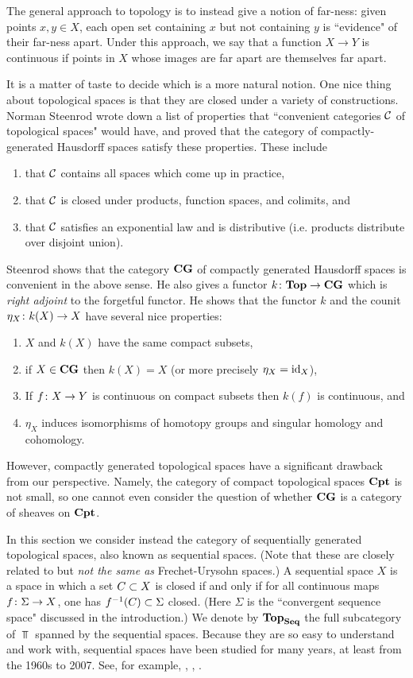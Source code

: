 \documentclass{amsart}
\def\Seq{{\bf Seq}}
\def\CG{{\bf CG}}
\begin{document}
The general approach to topology is to instead give a notion of far-ness: given points $x,y\in X$, each open set containing $x$ but not containing $y$ is ``evidence" of their far-ness apart.  Under this approach, we say that a function $X\to Y$ is continuous if points in $X$ whose images are far apart are themselves far apart.

It is a matter of taste to decide which is a more natural notion.  One nice thing about topological spaces is that they are closed under a variety of constructions.  Norman Steenrod \cite{Ste} wrote down a list of properties that ``convenient categories $\mcC$ of topological spaces" would have, and proved that the category of compactly-generated Hausdorff spaces satisfy these properties.  These include \begin{enumerate}\item that $\mcC$ contains all spaces which come up in practice, \item that $\mcC$ is closed under products, function spaces, and colimits, and \item that $\mcC$ satisfies an exponential law and is distributive (i.e. products distribute over disjoint union). \end{enumerate}

Steenrod shows that the category $\CG$ of compactly generated Hausdorff spaces is convenient in the above sense.  He also gives a functor $k\taking\Top\to\CG$ which is {\em right adjoint} to the forgetful functor.  He shows that the functor $k$ and the counit $\eta_X\taking k(X)\to X$ have several nice properties: \begin{enumerate}\item $X$ and $k(X)$ have the same compact subsets, \item if $X\in\CG$ then $k(X)=X$ (or more precisely $\eta_X=\id_X$), \item If $f\taking X\to Y$ is continuous on compact subsets then $k(f)$ is continuous, and \item $\eta_X$ induces isomorphisms of homotopy groups and singular homology and cohomology.\end{enumerate}

However, compactly generated topological spaces have a significant drawback from our perspective.  Namely, the category of compact topological spaces ${\bf Cpt}$ is not small, so one cannot even consider the question of whether $\CG$ is a category of sheaves on ${\bf Cpt}$.
 
In this section we consider instead the category of sequentially generated topological spaces, also known as sequential spaces. (Note that these are closely related to but {\em not the same as} Frechet-Urysohn spaces.)  A sequential space $X$ is a space in which a set $C\ss X$ is closed if and only if for all continuous maps $f\taking\Sigma\to X$, one has $f^\m1(C)\ss\Sigma$ closed.  (Here $\Sigma$ is the ``convergent sequence space" discussed in the introduction.)  We denote by $\Top_\Seq$ the full subcategory of $\Top$ spanned by the sequential spaces.  Because they are so easy to understand and work with, sequential spaces have been studied for many years, at least from the 1960s to 2007.  See, for example, \cite{Fra1}, \cite{Fra2}, \cite{Kel}. 
\end{document}
